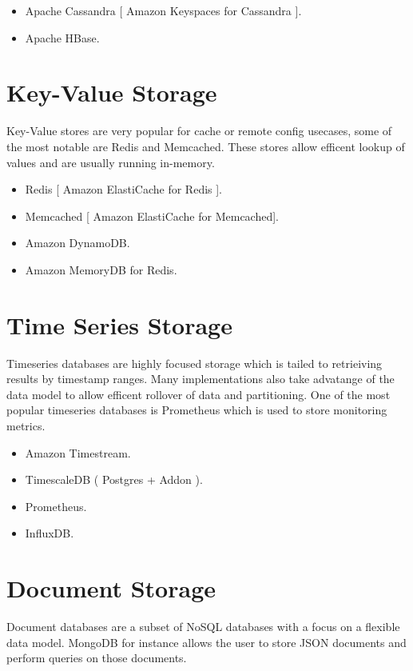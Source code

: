 \documentclass{csse4400}
\begin{document}
  \begin{itemize}
    \item Apache Cassandra [ Amazon Keyspaces for Cassandra ].
    \item Apache HBase.
  \end{itemize}

\section{Key-Value Storage}

Key-Value stores are very popular for cache or remote config usecases, some of the most notable are Redis and 
Memcached. These stores allow efficent lookup of values and are usually running in-memory.

\begin{itemize}
  \item Redis [ Amazon ElastiCache for Redis ].
  \item Memcached [ Amazon ElastiCache for Memcached].
  \item Amazon DynamoDB.
  \item Amazon MemoryDB for Redis.
\end{itemize}

\section{Time Series Storage}

Timeseries databases are highly focused storage which is tailed to retrieiving results by timestamp ranges.
Many implementations also take advatange of the data model to allow efficent rollover of data and partitioning.
One of the most popular timeseries databases is Prometheus which is used to store monitoring metrics.

\begin{itemize}
  \item Amazon Timestream.
  \item TimescaleDB ( Postgres + Addon ).
  \item Prometheus.
  \item InfluxDB.
\end{itemize}

\section{Document Storage}

Document databases are a subset of NoSQL databases with a focus on a flexible data model. MongoDB for instance 
allows the user to store JSON documents and perform queries on those documents.
\end{document}
